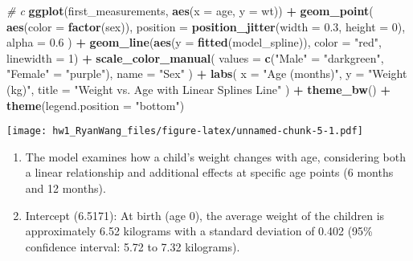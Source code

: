 \documentclass[
]{article}
\newenvironment{Shaded}{\begin{snugshade}}{\end{snugshade}}
\newcommand{\AttributeTok}[1]{\textcolor[rgb]{0.13,0.29,0.53}{#1}}
\newcommand{\CommentTok}[1]{\textcolor[rgb]{0.56,0.35,0.01}{\textit{#1}}}
\newcommand{\DecValTok}[1]{\textcolor[rgb]{0.00,0.00,0.81}{#1}}
\newcommand{\FloatTok}[1]{\textcolor[rgb]{0.00,0.00,0.81}{#1}}
\newcommand{\FunctionTok}[1]{\textcolor[rgb]{0.13,0.29,0.53}{\textbf{#1}}}
\newcommand{\NormalTok}[1]{#1}
\newcommand{\OtherTok}[1]{\textcolor[rgb]{0.56,0.35,0.01}{#1}}
\newcommand{\SpecialCharTok}[1]{\textcolor[rgb]{0.81,0.36,0.00}{\textbf{#1}}}
\newcommand{\StringTok}[1]{\textcolor[rgb]{0.31,0.60,0.02}{#1}}
\begin{document}
\begin{Shaded}
\begin{Highlighting}[]
\CommentTok{\# c}
\FunctionTok{ggplot}\NormalTok{(first\_measurements, }\FunctionTok{aes}\NormalTok{(}\AttributeTok{x =}\NormalTok{ age, }\AttributeTok{y =}\NormalTok{ wt)) }\SpecialCharTok{+}
  \FunctionTok{geom\_point}\NormalTok{(}
    \FunctionTok{aes}\NormalTok{(}\AttributeTok{color =} \FunctionTok{factor}\NormalTok{(sex)),}
    \AttributeTok{position =} \FunctionTok{position\_jitter}\NormalTok{(}\AttributeTok{width =} \FloatTok{0.3}\NormalTok{, }\AttributeTok{height =} \DecValTok{0}\NormalTok{),}
    \AttributeTok{alpha =} \FloatTok{0.6}
\NormalTok{  ) }\SpecialCharTok{+}
  \FunctionTok{geom\_line}\NormalTok{(}\FunctionTok{aes}\NormalTok{(}\AttributeTok{y =} \FunctionTok{fitted}\NormalTok{(model\_spline)), }\AttributeTok{color =} \StringTok{"red"}\NormalTok{, }\AttributeTok{linewidth =} \DecValTok{1}\NormalTok{) }\SpecialCharTok{+}  
  \FunctionTok{scale\_color\_manual}\NormalTok{(}
    \AttributeTok{values =} \FunctionTok{c}\NormalTok{(}\StringTok{"Male"} \OtherTok{=} \StringTok{"darkgreen"}\NormalTok{, }\StringTok{"Female"} \OtherTok{=} \StringTok{"purple"}\NormalTok{),}
    \AttributeTok{name =} \StringTok{"Sex"}
\NormalTok{  ) }\SpecialCharTok{+}
  \FunctionTok{labs}\NormalTok{(}
    \AttributeTok{x =} \StringTok{"Age (months)"}\NormalTok{,}
    \AttributeTok{y =} \StringTok{"Weight (kg)"}\NormalTok{,}
    \AttributeTok{title =} \StringTok{"Weight vs. Age with Linear Splines Line"}
\NormalTok{  ) }\SpecialCharTok{+}
  \FunctionTok{theme\_bw}\NormalTok{() }\SpecialCharTok{+}
  \FunctionTok{theme}\NormalTok{(}\AttributeTok{legend.position =} \StringTok{"bottom"}\NormalTok{)}
\end{Highlighting}
\end{Shaded}

\texttt{[image: hw1\_RyanWang\_files/figure-latex/unnamed-chunk-5-1.pdf]}

\begin{enumerate}
\def\labelenumi{\alph{enumi}.}
\setcounter{enumi}{3}
\item
  The model examines how a child's weight changes with age, considering
  both a linear relationship and additional effects at specific age
  points (6 months and 12 months).
\item
  Intercept (6.5171): At birth (age 0), the average weight of the
  children is approximately 6.52 kilograms with a standard deviation of
  0.402 (95\% confidence interval: 5.72 to 7.32 kilograms).
\end{enumerate}
\end{document}
